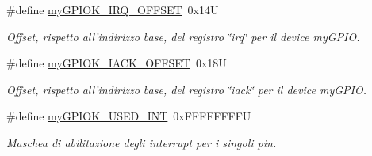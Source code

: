 \begin{DoxyCompactItemize}
\#define \hyperlink{group__ausiliarie_ga37ee502d1ba364dfde9261c4f7a537a6}{my\+G\+P\+I\+O\+K\+\_\+\+I\+R\+Q\+\_\+\+O\+F\+F\+S\+E\+T}~0x14\+U
\begin{DoxyCompactList}\small\item\em Offset, rispetto all'indirizzo base, del registro \char`\"{}irq\char`\"{} per il device my\+G\+P\+I\+O. \end{DoxyCompactList}\item 
\#define \hyperlink{group__ausiliarie_gac72408c288009c213c0231973b3fe761}{my\+G\+P\+I\+O\+K\+\_\+\+I\+A\+C\+K\+\_\+\+O\+F\+F\+S\+E\+T}~0x18\+U
\begin{DoxyCompactList}\small\item\em Offset, rispetto all'indirizzo base, del registro \char`\"{}iack\char`\"{} per il device my\+G\+P\+I\+O. \end{DoxyCompactList}\item 
\#define \hyperlink{group__ausiliarie_ga78d3a23bb3381a43eaba8bbf8b1cc750}{my\+G\+P\+I\+O\+K\+\_\+\+U\+S\+E\+D\+\_\+\+I\+N\+T}~0x\+F\+F\+F\+F\+F\+F\+F\+F\+U
\begin{DoxyCompactList}\small\item\em Maschea di abilitazione degli interrupt per i singoli pin. \end{DoxyCompactList}\end{DoxyCompactItemize}
